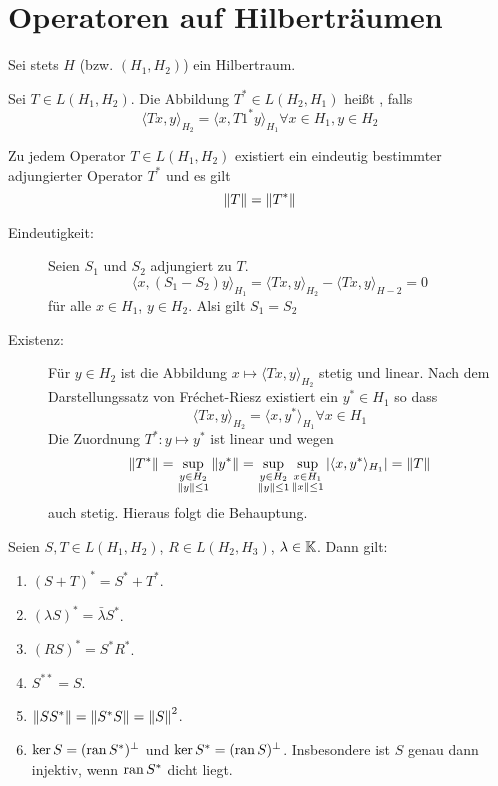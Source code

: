 \chapter{Operatoren auf Hilbertr\"aumen}
Sei stets $ H $ (bzw. $ (H_1,H_2) $) ein Hilbertraum.
\begin{definition}
	Sei $ T\in L(H_1,H_2) $. Die Abbildung $ T^\ast\in L(H_2,H_1) $ hei\ss t , falls
	\[ \langle Tx,y\rangle_{H_2}=\langle x,T1^\ast y\rangle_{H_1}\forall x\in H_1,y\in H_2 \] 
\end{definition}
\begin{satz}
	Zu jedem Operator $ T\in L(H_1,H_2) $ existiert ein eindeutig bestimmter adjungierter Operator $ T^\ast $ und es gilt
	\[ \left\|T\right\| = \left\|T^\ast\right\| \]
\end{satz}
\begin{beweis}
	\begin{description}
		\item[Eindeutigkeit:] Seien $ S_1 $ und $ S_2 $ adjungiert zu $ T $.
		\[ \langle x,(S_1-S_2)y\rangle_{H_1}=\langle Tx,y\rangle_{H_2}-\langle Tx,y\rangle_{H-2}=0 \]
		f\"ur alle $ x\in H_1 $, $ y\in H_2 $. Alsi gilt $ S_1=S_2 $
		\item[Existenz:] F\"ur $ y\in H_2 $ ist die Abbildung $ x\mapsto \langle Tx,y\rangle_{H_2} $ stetig und linear. Nach dem Darstellungssatz von Fr\'echet-Riesz existiert ein $ y^\ast\in H_1 $ so dass
		\[ \langle Tx,y\rangle_{H_2}=\langle x,y^\ast\rangle_{H_1}\forall x\in H_1 \]
		Die Zuordnung $ T^\ast\colon y\mapsto y^\ast $ ist linear und wegen 
		\[ \left\|T^\ast\right\|=\sup_{\substack{y\in H_2\\\left\|y\right\|\leq 1}}\left\|y^\ast\right\|=\sup_{\substack{y\in H_2\\\left\|y\right\|\leq 1}}\sup_{\substack{x\in H_1\\\left\|x\right\|\leq 1}}|\langle x,y^\ast\rangle_{H_1}|=\left\|T\right\| \]
		auch stetig. Hieraus folgt die Behauptung.
	\end{description}\vspace{-22pt}
\end{beweis}
\newpage
\begin{satz}
	Seien $ S,T\in L(H_1,H_2) $, $ R\in L(H_2,H_3) $, $ \lambda\in\mathbb{K} $. Dann gilt:
	\begin{enumerate}
		\item $ (S+T)^\ast=S^\ast+T^\ast $.
		\item $ (\lambda S)^\ast=\bar{\lambda}S^\ast $.
		\item $ (RS)^\ast=S^\ast R^\ast $.
		\item $ S^{\ast\ast}=S $.
		\item $ \left\|SS^\ast\right\|=\left\|S^\ast S\right\|=\left\|S\right\|^2 $.
		\item $ \ker S=(\operatorname{ran} S^\ast)^\perp $ und $ \ker S^\ast=(\operatorname{ran} S)^\perp $. Insbesondere ist $ S $ genau dann injektiv, wenn $ \operatorname{ran} S^\ast $ dicht liegt.
	\end{enumerate}
\end{satz}
